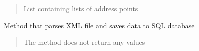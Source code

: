\documentclass[letterpaper,10pt,english]{sphinxmanual}
\begin{document}
\begin{fulllineitems}
\begin{fulllineitems}
\begin{quote}
\begin{description}
\sphinxAtStartPar
\sphinxcode{\sphinxupquote{List}}{[}\sphinxcode{\sphinxupquote{List}}{[}\sphinxcode{\sphinxupquote{str}}{]}{]}

\sphinxAtStartPar
List containing lists of address points

\end{description}\end{quote}

\end{fulllineitems}


\begin{fulllineitems}
\label{\detokenize{xml_parsers:xml_parsers.PRGDataParser.parse_xml}}
\pysigstartsignatures
{}
\pysigstopsignatures
\sphinxAtStartPar
Method that parses XML file and saves data to SQL database
\begin{quote}\begin{description}
\sphinxAtStartPar
{}

\sphinxAtStartPar
The method does not return any values

\end{description}\end{quote}

\end{fulllineitems}


\end{fulllineitems}

\end{document}
